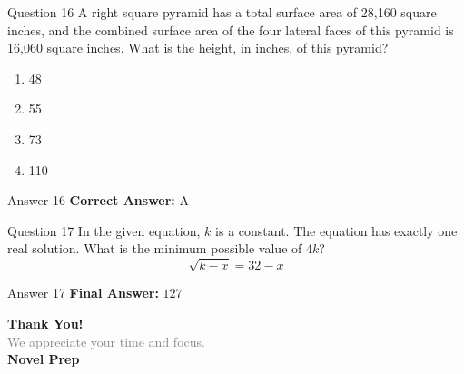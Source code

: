 \documentclass{beamer}
\begin{document}
\begin{frame}{Question 16}
\small
A right square pyramid has a total surface area of 28,160 square inches, and the combined surface area of the four lateral faces of this pyramid is 16,060 square inches.
What is the height, in inches, of this pyramid?
\vspace{0.35cm}
\begin{enumerate}
    \item[A.] 48
    \item[B.] 55
    \item[C.] 73
    \item[D.] 110
\end{enumerate}
\end{frame}
\begin{frame}{Answer 16}
\small
\textbf{Correct Answer:} A
\end{frame}

\begin{frame}{Question 17}
\small
In the given equation, \(k\) is a constant.
The equation has exactly one real solution.
What is the minimum possible value of \(4k\)?
\[
\sqrt{k - x} = 32 - x
\]
\end{frame}
\begin{frame}{Answer 17}
\small
\textbf{Final Answer:} $\boxed{127}$
\end{frame}

\begin{frame}{}
    \centering
    \vspace{5em}
    {\Huge \textbf{\textcolor{novelPurple}{Thank You!}}} \\[1em]
    {\large \textcolor{gray}{We appreciate your time and focus.}} \\[3em]
    {\LARGE \textbf{\textcolor{novelPurple}{\textsf{Novel Prep}}}}
    \vfill
\end{frame}
\end{document}
